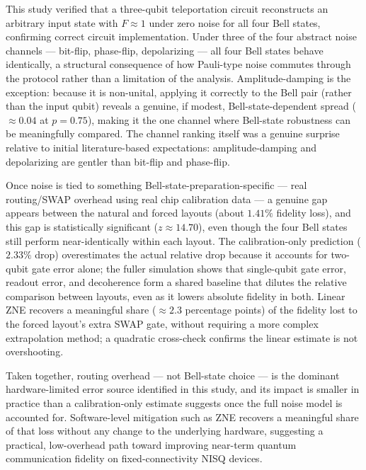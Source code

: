 \documentclass[11pt]{article}
\begin{document}
This study verified that a three-qubit teleportation circuit reconstructs an arbitrary input state with $F\approx1$ under zero noise for all four Bell states, confirming correct circuit implementation. Under three of the four abstract noise channels --- bit-flip, phase-flip, depolarizing --- all four Bell states behave identically, a structural consequence of how Pauli-type noise commutes through the protocol rather than a limitation of the analysis. Amplitude-damping is the exception: because it is non-unital, applying it correctly to the Bell pair (rather than the input qubit) reveals a genuine, if modest, Bell-state-dependent spread ($\approx0.04$ at $p=0.75$), making it the one channel where Bell-state robustness can be meaningfully compared. The channel ranking itself was a genuine surprise relative to initial literature-based expectations: amplitude-damping and depolarizing are gentler than bit-flip and phase-flip.

Once noise is tied to something Bell-state-preparation-specific --- real routing/SWAP overhead using real chip calibration data --- a genuine gap appears between the natural and forced layouts (about $1.41\%$ fidelity loss), and this gap is statistically significant ($z\approx14.70$), even though the four Bell states still perform near-identically within each layout. The calibration-only prediction ($2.33\%$ drop) overestimates the actual relative drop because it accounts for two-qubit gate error alone; the fuller simulation shows that single-qubit gate error, readout error, and decoherence form a shared baseline that dilutes the relative comparison between layouts, even as it lowers absolute fidelity in both. Linear ZNE recovers a meaningful share ($\approx2.3$ percentage points) of the fidelity lost to the forced layout's extra SWAP gate, without requiring a more complex extrapolation method; a quadratic cross-check confirms the linear estimate is not overshooting.

Taken together, routing overhead --- not Bell-state choice --- is the dominant hardware-limited error source identified in this study, and its impact is smaller in practice than a calibration-only estimate suggests once the full noise model is accounted for. Software-level mitigation such as ZNE recovers a meaningful share of that loss without any change to the underlying hardware, suggesting a practical, low-overhead path toward improving near-term quantum communication fidelity on fixed-connectivity NISQ devices.

\appendix
\end{document}

